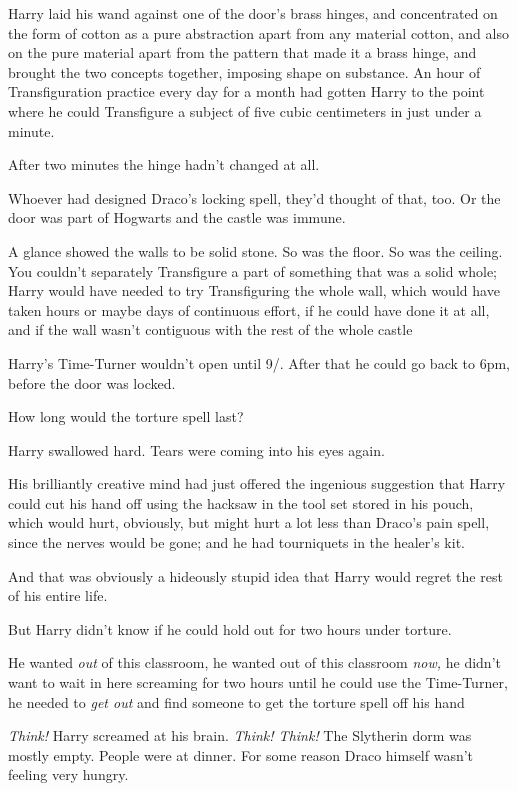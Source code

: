 Harry laid his wand against one of the door's brass hinges, and concentrated on
the form of cotton as a pure abstraction apart from any material cotton, and
also on the pure material apart from the pattern that made it a brass hinge,
and brought the two concepts together, imposing shape on substance. An hour of
Transfiguration practice every day for a month had gotten Harry to the point
where he could Transfigure a subject of five cubic centimeters in just under a
minute.

After two minutes the hinge hadn't changed at all.

Whoever had designed Draco's locking spell, they'd thought of that, too. Or the
door was part of Hogwarts and the castle was immune.

A glance showed the walls to be solid stone. So was the floor. So was the
ceiling. You couldn't separately Transfigure a part of something that was a
solid whole; Harry would have needed to try Transfiguring the whole wall, which
would have taken hours or maybe days of continuous effort, if he could have
done it at all, and if the wall wasn't contiguous with the rest of the whole
castle{\el}

Harry's Time-Turner wouldn't open until 9\PM/. After that he could go back to
6pm, before the door was locked.

How long would the torture spell last?

Harry swallowed hard. Tears were coming into his eyes again.

His brilliantly creative mind had just offered the ingenious suggestion that
Harry could cut his hand off using the hacksaw in the tool set stored in his
pouch, which would hurt, obviously, but might hurt a lot less than Draco's pain
spell, since the nerves would be gone; and he had tourniquets in the healer's
kit.

And that was obviously a hideously stupid idea that Harry would regret the rest
of his entire life.

But Harry didn't know if he could hold out for two hours under torture.

He wanted \emph{out} of this classroom, he wanted out of this classroom
\emph{now,} he didn't want to wait in here screaming for two hours until he
could use the Time-Turner, he needed to \emph{get out} and find someone to get
the torture spell off his hand{\el}

\emph{Think!} Harry screamed at his brain. \emph{Think! Think!}
\sbreak
The Slytherin dorm was mostly empty. People were at dinner. For some reason
Draco himself wasn't feeling very hungry.

